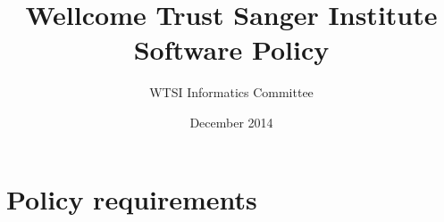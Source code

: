 \documentclass[10pt,a4paper]{article}
\begin{document}
\title{
Wellcome Trust Sanger Institute \\
Software Policy
}
\author{WTSI Informatics Committee}
\date{December 2014}

\maketitle

\newcommand{\exectitle}[0]{Chief Operating Officer}

\newcommand{\execperson}[0]{Martin Dougherty} 

\newcommand{\filename}[1]{\texttt{#1}} 

\newenvironment{boilerplate}[1][]
  {\minipage{\linewidth}%
   \lstset{basicstyle=\ttfamily\footnotesize,breaklines=false,frame=shadowbox,rulesepcolor=\color{blue},#1}}
   {\endminipage}%

\setlength{\parindent}{0pt} %

\setlength{\parskip}{4mm plus2mm minus2mm}

\let\stdsection\section
\renewcommand\section{\newpage\stdsection}

\section{Policy requirements}
\label{section:policy}

\end{document}
